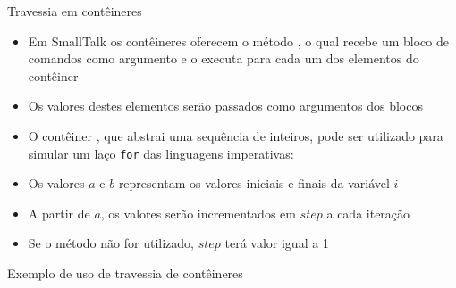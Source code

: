 \begin{frame}[fragile]{Travessia em contêineres}

    \begin{itemize}
        \item Em SmallTalk os contêineres oferecem o método , o qual 
            recebe um bloco de comandos como argumento e o executa para cada um dos elementos
            do contêiner

        \item Os valores destes elementos serão passados como argumentos dos blocos

        \item O contêiner , que abstrai uma sequência de inteiros,
            pode ser utilizado para simular um laço \texttt{for} das linguagens imperativas:


        \item Os valores $a$ e $b$ representam os valores iniciais e finais da variável $i$

        \item A partir de $a$, os valores serão incrementados em $step$ a cada iteração

        \item Se o método  não for utilizado, $step$ terá valor igual a 1
    \end{itemize}

\end{frame}

\begin{frame}[fragile]{Exemplo de uso de travessia de contêineres}
\end{frame}
